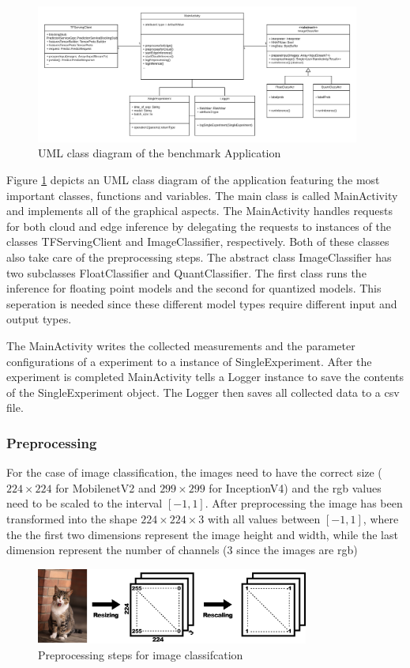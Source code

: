 \begin{figure}[htb]
\centering
\includegraphics[width=0.95\textwidth]{./Bilder/UML.png}
\caption{UML class diagram of the benchmark Application}
\label{fig:UML}
\end{figure}
Figure \ref{fig:UML} depicts an UML class diagram of the application featuring the most important classes, functions and variables. 
The main class is called MainActivity and implements all of the graphical aspects. 
The MainActivity handles requests for both cloud and edge inference by delegating the requests to instances of the classes TFServingClient and ImageClassifier, respectively. Both of these classes also take care of the preprocessing steps.
The abstract class ImageClassifier has two subclasses FloatClassifier and QuantClassifier. The first class runs the inference for floating point models and the second for quantized models.
This seperation is needed since these different model types require different input and output types.

The MainActivity writes the collected measurements and the parameter configurations of a experiment to a instance of SingleExperiment. After the experiment is completed MainActivity tells a Logger instance to save the contents of the SingleExperiment object. The Logger then saves all collected data to a csv file.

\subsubsection{Preprocessing}
For the case of image classification, the images need to have the correct size ($224\times224$ for MobilenetV2 and $299\times299$ for InceptionV4) and the rgb values need to be scaled to the interval $[-1,1]$. After preprocessing the image has been transformed into the shape $224\times224\times3$ with all values between $[-1,1]$, where the the first two dimensions represent the image height and width, while the last dimension represent the number of channels (3 since the images are rgb)
\begin{figure}[H]
\centering
\includegraphics[width=0.8\textwidth]{./Bilder/preprocessing.png}
\caption{Preprocessing steps for image classifcation}
\label{fig:prepro}
\end{figure}
